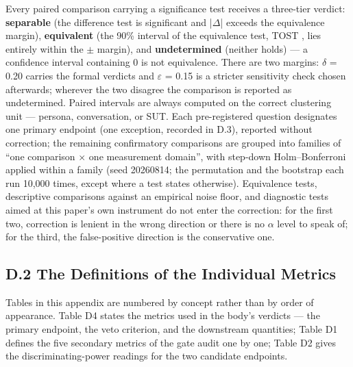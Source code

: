 \documentclass[letterpaper]{article}
\begin{document}
Every paired comparison carrying a significance test receives a three-tier verdict: \textbf{separable} (the difference test is significant and |$\Delta$| exceeds the equivalence margin), \textbf{equivalent} (the 90\% interval of the equivalence test, TOST \citep{lakens2017}, lies entirely within the $\pm$ margin), and \textbf{undetermined} (neither holds) --- a confidence interval containing 0 is not equivalence. There are two margins: $\delta$ = 0.20 carries the formal verdicts and $\varepsilon$ = 0.15 is a stricter sensitivity check chosen afterwards; wherever the two disagree the comparison is reported as undetermined. Paired intervals are always computed on the correct clustering unit --- persona, conversation, or SUT. Each pre-registered question designates one primary endpoint (one exception, recorded in D.3), reported without correction; the remaining confirmatory comparisons are grouped into families of ``one comparison $\times$ one measurement domain'', with step-down Holm--Bonferroni \citep{holm1979} applied within a family (seed 20260814; the permutation and the bootstrap each run 10,000 times, except where a test states otherwise). Equivalence tests, descriptive comparisons against an empirical noise floor, and diagnostic tests aimed at this paper's own instrument do not enter the correction: for the first two, correction is lenient in the wrong direction or there is no $\alpha$ level to speak of; for the third, the false-positive direction is the conservative one.


\subsection*{D.2 The Definitions of the Individual Metrics}

Tables in this appendix are numbered by concept rather than by order of appearance. Table D4 states the metrics used in the body's verdicts --- the primary endpoint, the veto criterion, and the downstream quantities; Table D1 defines the five secondary metrics of the gate audit one by one; Table D2 gives the discriminating-power readings for the two candidate endpoints.
\end{document}
